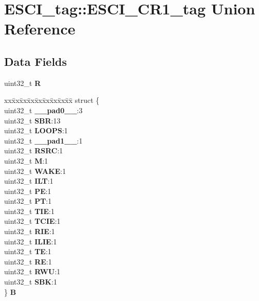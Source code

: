 \hypertarget{unionESCI__tag_1_1ESCI__CR1__tag}{}\section{E\+S\+C\+I\+\_\+tag\+::E\+S\+C\+I\+\_\+\+C\+R1\+\_\+tag Union Reference}
\label{unionESCI__tag_1_1ESCI__CR1__tag}
\subsection*{Data Fields}
\begin{DoxyCompactItemize}
\item 
\mbox{\label{unionESCI__tag_1_1ESCI__CR1__tag_a67c4b24da5d696a7f0d0903fbf280e2b}} 
uint32\+\_\+t {\bfseries R}
\item 
\mbox{\label{unionESCI__tag_1_1ESCI__CR1__tag_af5f444a00d0caf5c574e85f4480d4177}} 
\begin{tabbing}
xx\=xx\=xx\=xx\=xx\=xx\=xx\=xx\=xx\=\kill
struct \{\\
\>uint32\_t {\bfseries \_\_pad0\_\_}:3\\
\>uint32\_t {\bfseries SBR}:13\\
\>uint32\_t {\bfseries LOOPS}:1\\
\>uint32\_t {\bfseries \_\_pad1\_\_}:1\\
\>uint32\_t {\bfseries RSRC}:1\\
\>uint32\_t {\bfseries M}:1\\
\>uint32\_t {\bfseries WAKE}:1\\
\>uint32\_t {\bfseries ILT}:1\\
\>uint32\_t {\bfseries PE}:1\\
\>uint32\_t {\bfseries PT}:1\\
\>uint32\_t {\bfseries TIE}:1\\
\>uint32\_t {\bfseries TCIE}:1\\
\>uint32\_t {\bfseries RIE}:1\\
\>uint32\_t {\bfseries ILIE}:1\\
\>uint32\_t {\bfseries TE}:1\\
\>uint32\_t {\bfseries RE}:1\\
\>uint32\_t {\bfseries RWU}:1\\
\>uint32\_t {\bfseries SBK}:1\\
\} {\bfseries B}\\


\end{tabbing}
\end{DoxyCompactItemize}

